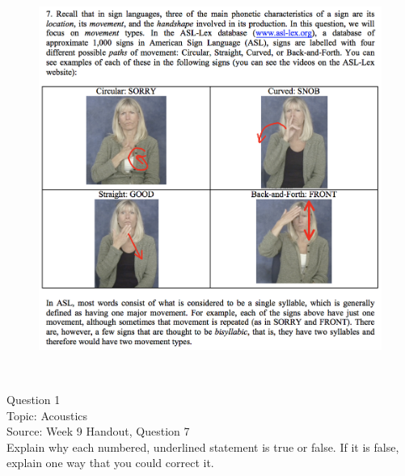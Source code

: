 \documentclass[12pt]{article}
\begin{document}
\begin{figure}[H]
\includegraphics{../images/ASL_movement.png}
\end{figure}

\newpage

\begin{center}
\textbf{{\color{red}{\HUGE END OF EXAM}}}\\

\end{center}
\newpage

\begin{center}
\textbf{{\color{blue}{\HUGE START OF EXAM\\}}}

\textbf{{\color{blue}{\HUGE Student ID: 59669\\}}}

\textbf{{\color{blue}{\HUGE 4:20\\}}}

\end{center}
\newpage

{\large Question 1}\\

Topic: Acoustics\\
Source: Week 9 Handout, Question 7\\

Explain why each numbered, underlined statement is true or false. If it is false, explain one way that you could correct it.\\
\end{document}
